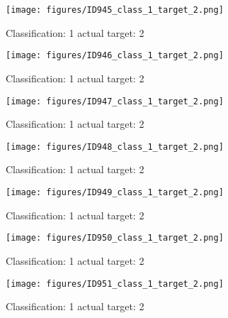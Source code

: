 \begin{figure}[h!]
\begin{center}
\texttt{[image: figures/ID945\_class\_1\_target\_2.png]}
\end{center}
\caption{ Classification: 1 actual target: 2}
\label{fig:ID945_class_1_target_2}
\end{figure}
\begin{figure}[h!]
\begin{center}
\texttt{[image: figures/ID946\_class\_1\_target\_2.png]}
\end{center}
\caption{ Classification: 1 actual target: 2}
\label{fig:ID946_class_1_target_2}
\end{figure}
\begin{figure}[h!]
\begin{center}
\texttt{[image: figures/ID947\_class\_1\_target\_2.png]}
\end{center}
\caption{ Classification: 1 actual target: 2}
\label{fig:ID947_class_1_target_2}
\end{figure}
\begin{figure}[h!]
\begin{center}
\texttt{[image: figures/ID948\_class\_1\_target\_2.png]}
\end{center}
\caption{ Classification: 1 actual target: 2}
\label{fig:ID948_class_1_target_2}
\end{figure}
\begin{figure}[h!]
\begin{center}
\texttt{[image: figures/ID949\_class\_1\_target\_2.png]}
\end{center}
\caption{ Classification: 1 actual target: 2}
\label{fig:ID949_class_1_target_2}
\end{figure}
\begin{figure}[h!]
\begin{center}
\texttt{[image: figures/ID950\_class\_1\_target\_2.png]}
\end{center}
\caption{ Classification: 1 actual target: 2}
\label{fig:ID950_class_1_target_2}
\end{figure}
\begin{figure}[h!]
\begin{center}
\texttt{[image: figures/ID951\_class\_1\_target\_2.png]}
\end{center}
\caption{ Classification: 1 actual target: 2}
\label{fig:ID951_class_1_target_2}
\end{figure}
